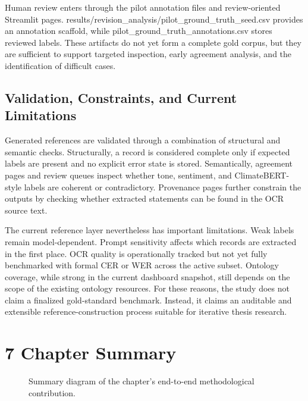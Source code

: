Human review enters through the pilot annotation files and review-oriented Streamlit pages. results/revision\_analysis/pilot\_ground\_truth\_seed.csv provides an annotation scaffold, while pilot\_ground\_truth\_annotations.csv stores reviewed labels. These artifacts do not yet form a complete gold corpus, but they are sufficient to support targeted inspection, early agreement analysis, and the identification of difficult cases.

\subsection{Validation, Constraints, and Current Limitations}

Generated references are validated through a combination of structural and semantic checks. Structurally, a record is considered complete only if expected labels are present and no explicit error state is stored. Semantically, agreement pages and review queues inspect whether tone, sentiment, and ClimateBERT-style labels are coherent or contradictory. Provenance pages further constrain the outputs by checking whether extracted statements can be found in the OCR source text.

The current reference layer nevertheless has important limitations. Weak labels remain model-dependent. Prompt sensitivity affects which records are extracted in the first place. OCR quality is operationally tracked but not yet fully benchmarked with formal CER or WER across the active subset. Ontology coverage, while strong in the current dashboard snapshot, still depends on the scope of the existing ontology resources. For these reasons, the study does not claim a finalized gold-standard benchmark. Instead, it claims an auditable and extensible reference-construction process suitable for iterative thesis research.

\section{7 Chapter Summary}

\begin{figure}[ht]
\begin{center}
\end{center}
\caption{Summary diagram of the chapter's end-to-end methodological contribution.}
\label{fig:implementation-summary}
\end{figure}

